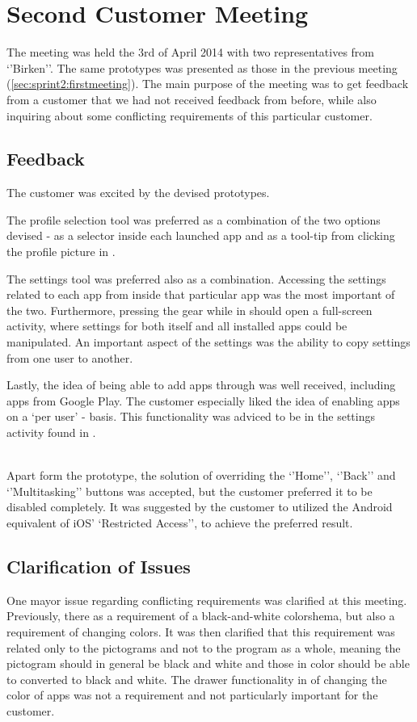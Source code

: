 \section{Second Customer Meeting}

The meeting was held the 3rd of April 2014 with two representatives from `'Birken''.
The same prototypes was presented as those in the previous meeting (\cref{sec:sprint2:firstmeeting}).
The main purpose of the meeting was to get feedback from a customer that we had not received feedback from before, while also inquiring about some conflicting requirements of this particular customer.

\subsection{Feedback}
The customer was excited by the devised prototypes.

The profile selection tool was preferred as a combination of the two options devised - as a selector inside each launched app and as a tool-tip from clicking the profile picture in \launcher.

The settings tool was preferred also as a combination.
Accessing the settings related to each app from inside that particular app was the most important of the two.
Furthermore, pressing the gear while in \launcher should open a full-screen activity, where settings for both \launcher itself and all installed apps could be manipulated.
An important aspect of the settings was the ability to copy settings from one user to another.

Lastly, the idea of being able to add apps through \launcher was well received, including apps from Google Play.
The customer especially liked the idea of enabling apps on a `per user' - basis.
This functionality was adviced to be in the settings activity found in \launcher.

\mbox{}\\
Apart form the prototype, the solution of overriding the `'Home'', `'Back'' and `'Multitasking'' buttons was accepted, but the customer preferred it to be disabled completely.
It was suggested by the customer to utilized the Android equivalent of iOS' `Restricted Access'', to achieve the preferred result.

\subsection{Clarification of Issues}
One mayor issue regarding conflicting requirements was clarified at this meeting.
Previously, there as a requirement of a black-and-white colorshema, but also a requirement of changing colors.
It was then clarified that this requirement was related only to the pictograms and not to the program as a whole, meaning the pictogram should in general be black and white and those in color should be able to converted to black and white.
The drawer functionality in \launcher of changing the color of apps was not a requirement and not particularly important for the customer.

